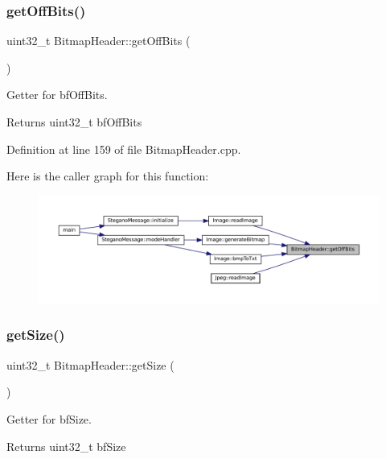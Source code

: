 \subsubsection{\texorpdfstring{getOffBits()}{getOffBits()}}
{\footnotesize\ttfamily uint32\+\_\+t Bitmap\+Header\+::get\+Off\+Bits (\begin{DoxyParamCaption}{ }\end{DoxyParamCaption})}



Getter for bf\+Off\+Bits. 

\begin{DoxyReturn}{Returns}
uint32\+\_\+t bf\+Off\+Bits 
\end{DoxyReturn}


Definition at line 159 of file Bitmap\+Header.\+cpp.

Here is the caller graph for this function\+:\nopagebreak
\begin{figure}[H]
\begin{center}
\leavevmode
\includegraphics[width=350pt]{classBitmapHeader_a70702e4d8aba2a3502f776f73bfecde8_icgraph}
\end{center}
\end{figure}
\mbox{\label{classBitmapHeader_a53309aa035484da90e8170f9950aa86b}} 
\subsubsection{\texorpdfstring{getSize()}{getSize()}}
{\footnotesize\ttfamily uint32\+\_\+t Bitmap\+Header\+::get\+Size (\begin{DoxyParamCaption}{ }\end{DoxyParamCaption})}



Getter for bf\+Size. 

\begin{DoxyReturn}{Returns}
uint32\+\_\+t bf\+Size 
\end{DoxyReturn}


